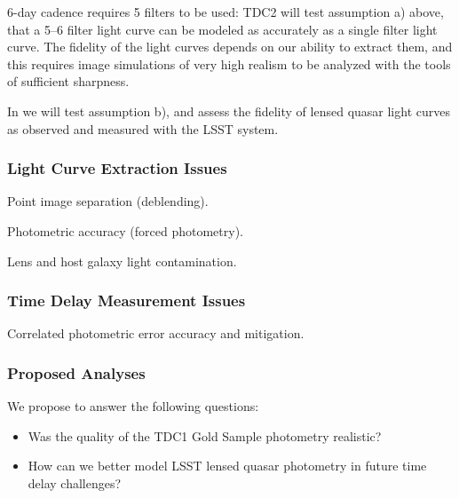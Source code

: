 6-day cadence requires 5 filters to be used: TDC2 will test
assumption a) above, that  a 5--6 filter light curve can be modeled as
accurately as a single filter light curve. The fidelity of the light
curves depends on our ability to extract them, and this requires image
simulations of very high realism to be analyzed with the tools of
sufficient sharpness.

In \TwinklesOne we will test assumption b), and assess the fidelity of
lensed quasar light curves as observed and measured with the LSST system.


\subsubsection{Light Curve Extraction Issues}
\label{sec:twinkles1:science:stronglensing:monitor}

Point image separation (deblending).

Photometric accuracy (forced photometry).

Lens and host galaxy light contamination.



\subsubsection{Time Delay Measurement Issues}
\label{sec:twinkles1:science:stronglensing:timedelay}

Correlated photometric error accuracy and mitigation.



\subsubsection{Proposed Analyses}
\label{sec:twinkles1:science:stronglensing:analyses}

We propose to answer the following questions:
\begin{itemize}
\item Was the quality of the TDC1 Gold Sample photometry realistic?
\item How can we better model LSST lensed quasar photometry in future time delay challenges?
\end{itemize}

